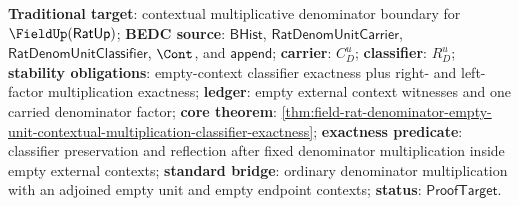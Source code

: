 \textbf{Traditional target}: contextual multiplicative denominator boundary for
$\FieldUp(\mathsf{RatUp})$; \textbf{BEDC source}: $\mathsf{BHist}$,
$\mathsf{RatDenomUnitCarrier}$, $\mathsf{RatDenomUnitClassifier}$, $\Cont$, and
$\mathsf{append}$; \textbf{carrier}: $C_D^u$; \textbf{classifier}: $R_D^u$;
\textbf{stability obligations}: empty-context classifier exactness plus
right- and left-factor multiplication exactness; \textbf{ledger}: empty
external context witnesses and one carried denominator factor; \textbf{core
theorem}:
\autoref{thm:field-rat-denominator-empty-unit-contextual-multiplication-classifier-exactness};
\textbf{exactness predicate}: classifier preservation and reflection after
fixed denominator multiplication inside empty external contexts;
\textbf{standard bridge}: ordinary denominator multiplication with an adjoined
empty unit and empty endpoint contexts; \textbf{status}:
$\mathsf{ProofTarget}$.


